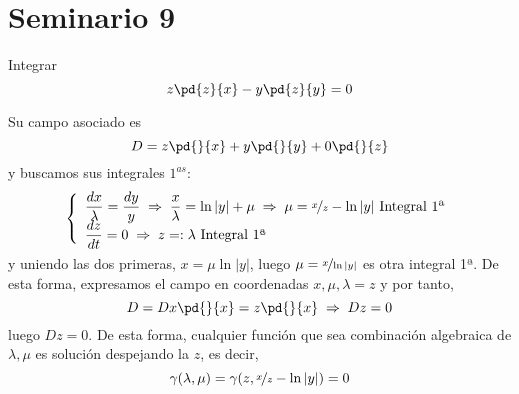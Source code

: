 \section{Seminario 9}
\begin{ejer}[\textbf{59}] Integrar
    $$z\pd{z}{x}- y\pd{z}{y} = 0$$
\end{ejer}
\begin{sol}
    Su campo asociado es 
    $$D=z \pd{}{x} + y\pd{}{y} + 0\pd{}{z} $$
    y buscamos sus integrales $1^{as}$:
    $$ \left\{ \begin{array}{l}
     \dfrac{dx}{\lambda}=\dfrac{dy}{y} \; \Rightarrow \; \dfrac{x}{\lambda}=\ln|y|+\mu \; \Rightarrow \; \mu=\nicefrac{x}{z}-\ln|y| \text{ Integral 1ª} \\  
     \vspace{-5mm} \\
    \dfrac{dz}{dt}=0 \; \Rightarrow \; z=:\lambda \text{ Integral 1ª}\\
     \vspace{-5mm} \\
\end{array}\right.$$
y uniendo las dos primeras, $x=\mu \ln|y|$, luego $\mu=\nicefrac{x}{\ln|y|}$ es otra integral 1ª. De esta forma, expresamos el campo en coordenadas $x, \mu,\lambda=z$ y por tanto, 
$$D=Dx \pd{}{x} = z \pd{}{x} \; \Rightarrow \; Dz=0$$
luego $Dz=0$. De esta forma, cualquier función que sea combinación algebraica de $\lambda, \mu$ es solución despejando la $z$, es decir, 
$$\gamma(\lambda,\mu)=\gamma(z,\nicefrac{x}{z}-\ln|y|)=0 $$
\end{sol}



